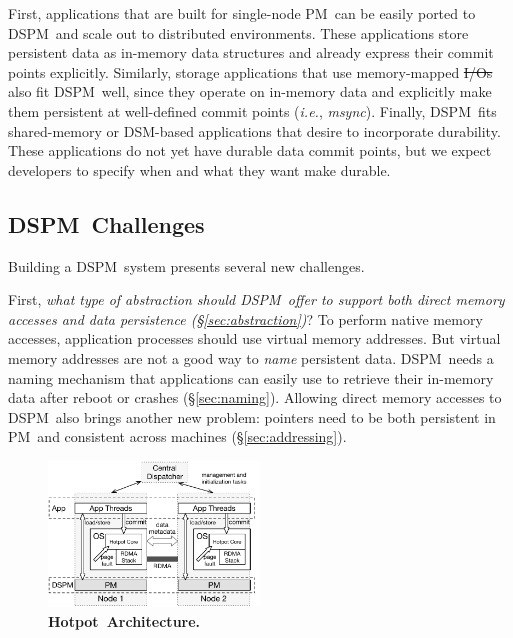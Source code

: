 \documentclass[sigconf]{acmart}
\renewcommand{\em}{\it}
\newcommand{\mycaption}[3]{\caption{\label{#1}{\bf #2} \em\small #3}}
\newcommand{\ie}{\textit{i.e.}}
\newcommand{\msync}{\textit{msync}}
\newcommand{\dsnvm}{DSPM}
\newcommand{\nvm}{PM}
\newcommand{\hotpot}{Hotpot}
\providecommand{\DIFadd}[1]{{\protect\color{blue}\uwave{#1}}} %
\providecommand{\DIFdel}[1]{{\protect\color{red}\sout{#1}}}                      %
\providecommand{\DIFaddbegin}{} %
\providecommand{\DIFaddend}{} %
\providecommand{\DIFdelbegin}{} %
\providecommand{\DIFdelend}{} %
\begin{document}
{\DIFaddend First, applications that are built for single-node \nvm\
can be easily ported to \dsnvm\ and scale out to distributed environments.
These applications store persistent data as in-memory data structures 
and already express their commit points explicitly.
Similarly, storage applications that use memory-mapped \DIFdelbegin \DIFdel{I/Os }\DIFdelend \DIFaddbegin \DIFadd{files }\DIFaddend also fit \dsnvm\ well,
since they operate on in-memory data and explicitly make them persistent at well-defined commit points (\ie, \msync).
Finally, \dsnvm\ fits shared-memory or DSM-based applications that desire to incorporate durability.
These applications do not yet have durable data commit points,
but we expect developers to specify when and what they want make durable.

\DIFdelbegin %
\DIFdelend \subsection{\dsnvm\ Challenges}
\label{sec:challenges}
\DIFdelbegin %
\DIFdelend Building a \dsnvm\ system presents several new challenges.

First, {\em what type of abstraction should \dsnvm\ offer to support both direct memory accesses and data persistence (\S\ref{sec:abstraction})}?
To perform native memory accesses, application processes should use virtual memory addresses. 
But virtual memory addresses are not a good way to {\em name} persistent data.
\dsnvm\ needs a naming mechanism that applications can easily use to retrieve their in-memory data after reboot or crashes (\S\ref{sec:naming}).
Allowing direct memory accesses to \dsnvm\ also brings another new problem:
pointers need to be both persistent in \nvm\ and consistent across machines (\S\ref{sec:addressing}).

\DIFaddbegin {
\begin{figure}[th]
\begin{center}
\centerline{\includegraphics[width=0.5\textwidth]{Figures/architecture.pdf}}
\mycaption{fig-architecture}{\hotpot\ Architecture.}
{
}
\end{center}
\end{figure}
}


}
\end{document}
